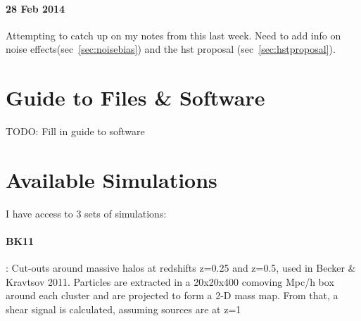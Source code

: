 \documentclass[11pt]{article}
\begin{document}
\paragraph{28 Feb 2014}
Attempting to catch up on my notes from this last week. Need to add info on noise effects(sec~\ref{sec:noisebias}) and the hst proposal (sec~\ref{sec:hstproposal}).


\clearpage \newpage


\section{Guide to Files \& Software}

TODO: Fill in guide to software



\clearpage \newpage


\section{Available Simulations}

I have access to 3 sets of simulations:

\paragraph{BK11} : Cut-outs around massive halos at redshifts z=0.25 and z=0.5, used in Becker \& Kravtsov 2011. Particles are extracted in a 20x20x400 comoving Mpc/h box around each cluster and are projected to form a 2-D mass map. From that, a shear signal is calculated, assuming sources are at z=1
\end{document}
